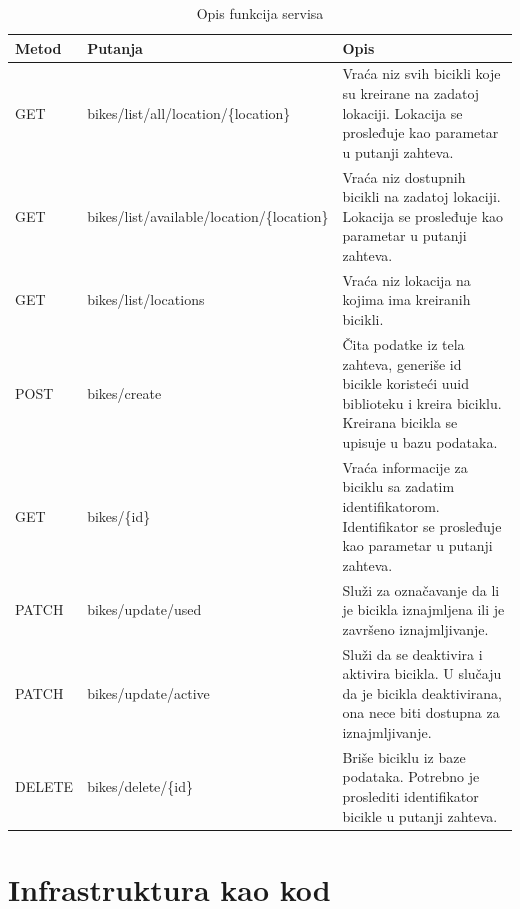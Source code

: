 \documentclass[12pt,oneside]{memoir}
\begin{document}
\begin{table}
  \centering
  \caption{Opis funkcija servisa}
  \label{tbl:funkcije}
  \begin{tabular}{|p{2cm}|p{7cm}|p{4cm}|} %
    \hline
      Metod& Putanja & Opis \\
    \hline
    GET & bikes/list/all/location/\{location\} & Vraća niz svih bicikli koje su kreirane na zadatoj lokaciji. Lokacija se prosleđuje kao parametar u putanji zahteva.\\
    GET & bikes/list/available/location/\{location\} & Vraća niz dostupnih bicikli na zadatoj lokaciji. Lokacija se prosleđuje kao parametar u putanji zahteva.\\
    GET & bikes/list/locations & Vraća niz lokacija na kojima ima kreiranih bicikli.\\
    POST & bikes/create & Čita podatke iz tela zahteva, generiše id bicikle koristeći uuid biblioteku i kreira biciklu. Kreirana bicikla se upisuje u bazu podataka.\\
    GET & bikes/\{id\} & Vraća informacije za biciklu sa zadatim identifikatorom. Identifikator se prosleđuje kao parametar u putanji zahteva.\\
    PATCH & bikes/update/used & Služi za označavanje da li je bicikla iznajmljena ili je završeno iznajmljivanje.\\
    PATCH & bikes/update/active & Služi da se deaktivira i aktivira bicikla. U slučaju da je bicikla deaktivirana, ona nece biti dostupna za iznajmljivanje.\\
    DELETE & bikes/delete/\{id\} & Briše biciklu iz baze podataka. Potrebno je proslediti identifikator bicikle u putanji zahteva. \\
    \hline
  \end{tabular}
\end{table}


\section{Infrastruktura kao kod}
\end{document}
